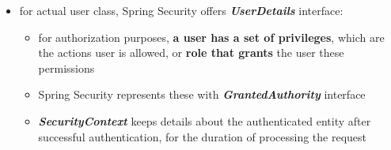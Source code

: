 \documentclass[ieeetran]{article}
\begin{document}
\begin{itemize}
\begin{itemize}
		  \item for actual user class, Spring Security offers \textit{\textbf{UserDetails}} interface:
			  \begin{itemize}
			    \item for authorization purposes, \textbf{a user has a set of privileges}, which are the actions user is allowed, or \textbf{role that grants} the user these permissions
				    \item Spring Security represents these with \textit{\textbf{GrantedAuthority}} interface
					    \item \textit{\textbf{SecurityContext}} keeps details about the authenticated entity after successful authentication, for the duration of processing the request
			  \end{itemize}
	\end{itemize}
\end{itemize}


































\end{document}
